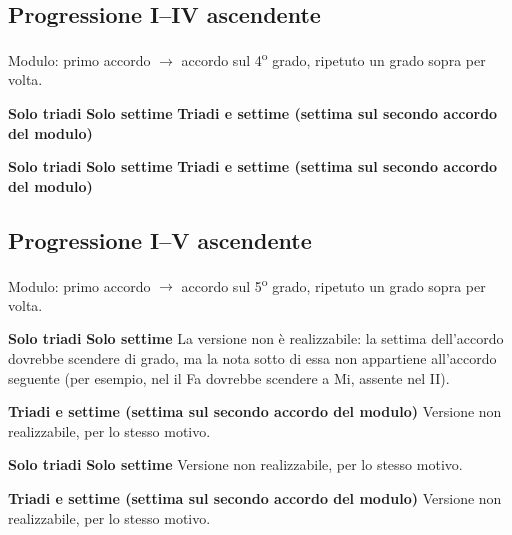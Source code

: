 \subsection{Progressione I–IV ascendente}
\label{subsec:prog_i4a}
Modulo: primo accordo $\rightarrow$ accordo sul 4\textsuperscript{o} grado, ripetuto un grado sopra per volta.

\begin{esempio}
	\label{ex:prog_i4a_dia}
	\textbf{Solo triadi}
	\textbf{Solo settime}
	\textbf{Triadi e settime (settima sul secondo accordo del modulo)}
\end{esempio}

\begin{esempio}
	\label{ex:prog_i4a_rea}
	\textbf{Solo triadi}
	\textbf{Solo settime}
	\textbf{Triadi e settime (settima sul secondo accordo del modulo)}
\end{esempio}

\subsection{Progressione I–V ascendente}
\label{subsec:prog_i5a}
Modulo: primo accordo $\rightarrow$ accordo sul 5\textsuperscript{o} grado, ripetuto un grado sopra per volta.

\begin{esempio}
	\label{ex:prog_i5a_dia}
	\textbf{Solo triadi}
	\textbf{Solo settime}
	La versione non è realizzabile: la settima dell'accordo dovrebbe scendere di grado, ma la nota sotto di essa non appartiene all'accordo seguente (per esempio, nel  il Fa dovrebbe scendere a Mi, assente nel II).

	\textbf{Triadi e settime (settima sul secondo accordo del modulo)}
	Versione non realizzabile, per lo stesso motivo.

\end{esempio}

\begin{esempio}
	\label{ex:prog_i5a_rea}
	\textbf{Solo triadi}
	\textbf{Solo settime}
	Versione non realizzabile, per lo stesso motivo.

	\textbf{Triadi e settime (settima sul secondo accordo del modulo)}
	Versione non realizzabile, per lo stesso motivo.

\end{esempio}

